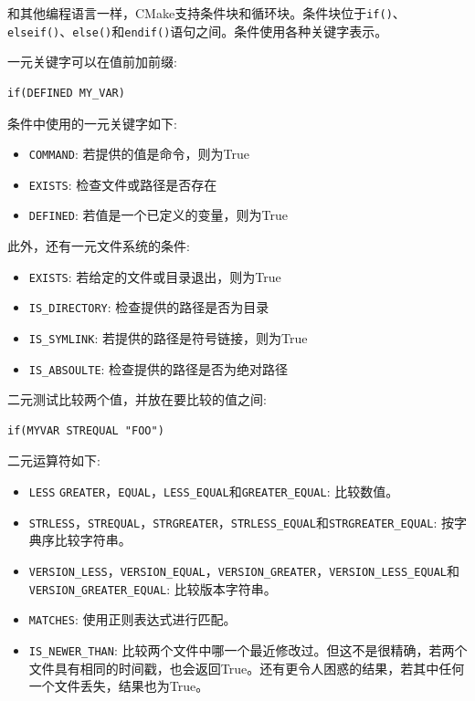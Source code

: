 和其他编程语言一样，CMake支持条件块和循环块。条件块位于\texttt{if()}、\texttt{elseif()}、\texttt{else()}和\texttt{endif()}语句之间。条件使用各种关键字表示。

一元关键字可以在值前加前缀:

\begin{lstlisting}[style=styleCMake]
if(DEFINED MY_VAR)
\end{lstlisting}

条件中使用的一元关键字如下:

\begin{itemize}
\item 
\texttt{COMMAND}: 若提供的值是命令，则为True

\item 
\texttt{EXISTS}: 检查文件或路径是否存在

\item 
\texttt{DEFINED}: 若值是一个已定义的变量，则为True
\end{itemize}

此外，还有一元文件系统的条件:

\begin{itemize}
\item 
\texttt{EXISTS}: 若给定的文件或目录退出，则为True

\item 
\texttt{IS\_DIRECTORY}: 检查提供的路径是否为目录

\item 
\texttt{IS\_SYMLINK}: 若提供的路径是符号链接，则为True

\item 
\texttt{IS\_ABSOULTE}: 检查提供的路径是否为绝对路径
\end{itemize}

二元测试比较两个值，并放在要比较的值之间:

\begin{lstlisting}[style=styleCMake]
if(MYVAR STREQUAL "FOO")
\end{lstlisting}

二元运算符如下:

\begin{itemize}
\item 
\texttt{LESS} \texttt{GREATER}，\texttt{EQUAL}，\texttt{LESS\_EQUAL}和\texttt{GREATER\_EQUAL}: 比较数值。

\item 
\texttt{STRLESS}，\texttt{STREQUAL}，\texttt{STRGREATER}，\texttt{STRLESS\_EQUAL}和\texttt{STRGREATER\_EQUAL}: 按字典序比较字符串。

\item 
\texttt{VERSION\_LESS}，\texttt{VERSION\_EQUAL}，\texttt{VERSION\_GREATER}，\texttt{VERSION\_LESS\_EQUAL}和\texttt{VERSION\_GREATER\_EQUAL}: 比较版本字符串。

\item 
\texttt{MATCHES}: 使用正则表达式进行匹配。

\item 
\texttt{IS\_NEWER\_THAN}: 比较两个文件中哪一个最近修改过。但这不是很精确，若两个文件具有相同的时间戳，也会返回True。还有更令人困惑的结果，若其中任何一个文件丢失，结果也为True。
\end{itemize}

